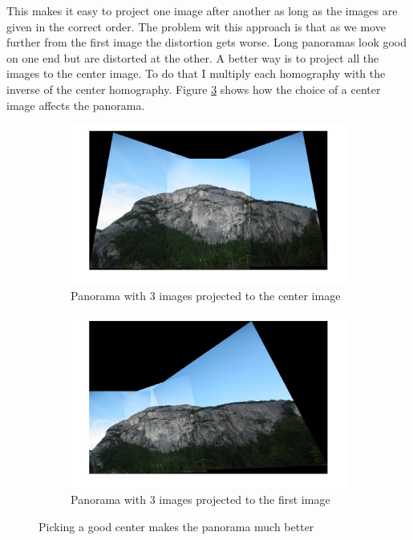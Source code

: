 \documentclass[12pt]{article}
\begin{document}
This makes it easy to project one image after another as long as the images are given in the correct order. The problem wit this approach is that as we move further from the first image the distortion gets worse. Long panoramas look good on one end but are distorted at the other. A better way is to project all the images to the center image. To do that I multiply each homography with the inverse of the center homography. Figure \ref{fig_pan_center} shows how the choice of a center image affects the panorama.

\begin{figure}[t!]
    \begin{subfigure}[t]{0.5\textwidth}
        \centering
        \includegraphics[width=\linewidth]{img/set2_panorama3}
        \caption{Panorama with 3 images projected to the center image}
        \label{fig_set2_pan1}
    \end{subfigure}
    \begin{subfigure}[t]{0.5\textwidth}
        \centering
        \includegraphics[width=\linewidth]{img/set2_panorama2}
        \caption{Panorama with 3 images projected to the first image}
        \label{fig_set2_pan2}
    \end{subfigure}
    \caption{Picking a good center makes the panorama much better}
    \label{fig_pan_center}
\end{figure}
\end{document}
